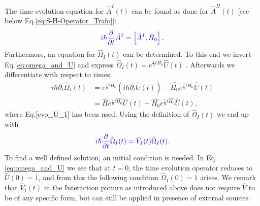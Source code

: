 \documentclass[
12pt, %
english, %
singlespacing, %
headsepline, %
]{MastersDoctoralThesis} %
\begin{document}
The time evolution equation for $ 	\hat{A}^{I}(t) $ can be found as done for $ \hat{A}^{H}(t) $ $ [ $see below Eq.\enskip\eqref{eq:S-H-Operator_Trafo}]:
\begin{equation}\label{eq:time_evo_equ_Intera}
\textcolor[RGB]{0,0,204}{
	i\hbar
	\frac{\partial}{\partial t}
	\hat{A}^{I}
	=
	\left[ 
	\hat{A}^{I},
	\hat{H}_{0}
	\right] .
}
\end{equation}
Furthermore, an equation for $ \hat{\Omega}_{I}(t) $ can be determined. To this end we invert Eq.\enskip\eqref{eq:omega_and_U} and express $  \hat{\Omega}_{I}(t) 
  		= e^{\frac{i}{\hbar}t \hat{H_{0}}}
			\hat{U}(t)  $ . Afterwards we differentiate with respect to times: 
\begin{subequations}
\begin{align}
  		i\hbar\partial_{t}\hat{\Omega}_{I}(t) 
  		 &= 
  		 e^{\frac{i}{\hbar}t\hat{H_{0}}}
  		 \left(i\hbar\partial_{t}\hat{U}(t) \right)
  		 -
  		 \hat{H_{0}}
   		 e^{\frac{i}{\hbar}t\hat{H_{0}}}
 		 \hat{U}(t)
  		 \\
  		 &=
  		 \hat{H}
  		  e^{\frac{i}{\hbar}t\hat{H_{0}}}  		 
  		 \hat{U}(t)  		 
  		 -
  		 \hat{H_{0}}
  		   e^{\frac{i}{\hbar}t\hat{H_{0}}}
  		 \hat{U}(t),
\end{align}
\end{subequations}
where Eq.\enskip\eqref{evo_U_1} has been used. Using the definition of $ \hat{\Omega}_{I}(t) $ we end up with
\begin{equation}\label{eq:time_evo_Omega_interaction}
\textcolor[RGB]{0,0,204}{
	i\hbar
	\frac{\partial}{\partial t}
	\hat{\Omega}_{I}(t)
	=
	\hat{V}_{I}(t)
	\hat{\Omega}_{I}(t)
.}
\end{equation}
To find a well defined solution, an initial condition is needed. In Eq.\enskip\eqref{eq:omega_and_U} we see that at $ t=0 $, the time evolution operator reduces to $ \hat{U}(0)=1 $, and from this the following condition $ \hat{\Omega}_{I}(0) = 1 $ arises.
We remark that $ \hat{V}_{I}(t) $ in the Interaction picture as introduced above does not require $ \hat{V} $ to be of any specific form, but can still be applied in presence of external sources. 
\end{document}
